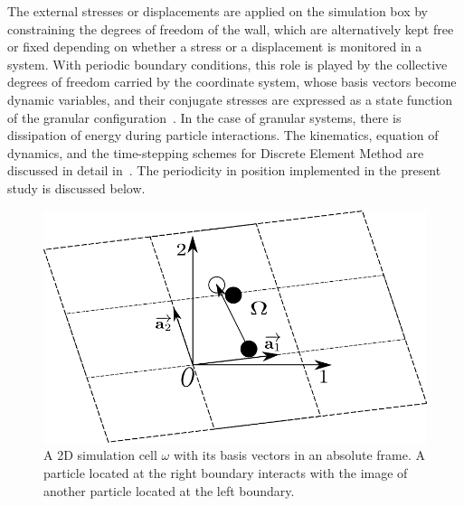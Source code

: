 The external stresses or displacements are applied on the simulation box by 
constraining the 
degrees of freedom of the wall, which are alternatively kept free or fixed 
depending on whether a 
stress or a displacement is monitored in a system. With periodic boundary 
conditions, this role is 
played by the collective degrees of freedom carried by the coordinate system, 
whose basis vectors 
become dynamic variables, and their conjugate stresses are expressed as a state 
function of the 
granular configuration~\citep{Par1980}. In the case of granular systems, there 
is dissipation of 
energy during particle interactions. The kinematics, equation of dynamics, and 
the time-stepping 
schemes for Discrete Element Method are discussed in detail 
in~\citet{Voiv2011}. The periodicity 
in 
position implemented in the present study is discussed below. 
\begin{figure}[htbp]
\centering
\includegraphics[scale=0.65]{periodic}
\caption[A 2D simulation cell $\omega$ with its basis vectors in an absolute 
frame]{A 2D 
simulation 
cell $\omega$ with its basis vectors in an absolute frame. A particle located 
at the right 
boundary 
interacts with the image of another particle located at the left boundary.}
\label{fig:periodic}
\end{figure}

